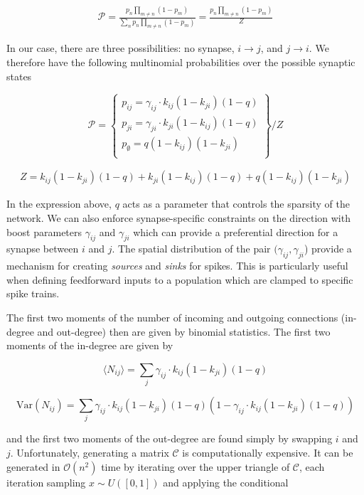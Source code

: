 \documentclass{ucetd}
\begin{document}
\begin{align*}
\mathcal{P} = \frac{p_{n}\prod_{m\neq n}(1-p_{m})}{\sum_{n}p_{n}\prod_{m\neq n}(1-p_{m})} = \frac{p_{n}\prod_{m\neq n}(1-p_{m})}{Z}
\end{align*}

In our case, there are three possibilities: no synapse, $i\rightarrow j$, and $j\rightarrow i$. We therefore have the following multinomial probabilities over the possible synaptic states

  \[
    \mathcal{P} = \left\{\begin{array}{lr}
        p_{ij} = \gamma_{ij}\cdot k_{ij}(1-k_{ji})(1-q)\\
        p_{ji} = \gamma_{ji}\cdot k_{ji}(1-k_{ij})(1-q)\\
        p_{\emptyset} = q(1-k_{ij})(1-k_{ji})\\
        \end{array}\right\}/Z
  \]
  
\begin{align*}
Z = k_{ij}(1-k_{ji})(1-q) + k_{ji}(1-k_{ij})(1-q) + q(1-k_{ij})(1-k_{ji})
\end{align*}

In the expression above, $q$ acts as a parameter that controls the sparsity of the network. We can also enforce synapse-specific constraints on the direction with boost parameters $\gamma_{ij}$ and $\gamma_{ji}$ which can provide a preferential direction for a synapse between $i$ and $j$. The spatial distribution of the pair $(\gamma_{ij},\gamma_{ji}$) provide a mechanism for creating \emph{sources} and \emph{sinks} for spikes. This is particularly useful when defining feedforward inputs to a population which are clamped to specific spike trains. 

The first two moments of  the number of incoming and outgoing connections (in-degree and out-degree) then are given by binomial statistics. The first two moments of the in-degree are given by

\begin{equation*}
\langle N_{ij} \rangle = \sum_{j} \gamma_{ij}\cdot k_{ij}(1-k_{ji})(1-q)
\end{equation*}

\begin{equation*}
\mathrm{Var}(N_{ij}) = \sum_{j}\gamma_{ij}\cdot k_{ij}(1-k_{ji})(1-q)(1-\gamma_{ij}\cdot k_{ij}(1-k_{ji})(1-q))
\end{equation*}

and the first two moments of the out-degree are found simply by swapping $i$ and $j$. Unfortunately, generating a matrix $\mathcal{C}$ is computationally expensive. It can be generated in $\mathcal{O}(n^{2})$ time by iterating over the upper triangle of $\mathcal{C}$, each iteration sampling $x\sim U([0,1])$ and applying the conditional
\end{document}
